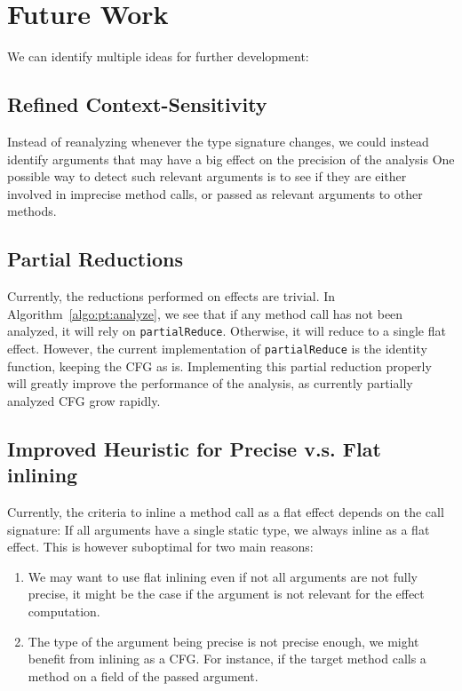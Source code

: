 \documentclass[a4paper]{article}
\begin{document}

\section{Future Work}
We can identify multiple ideas for further development:

\subsection{Refined Context-Sensitivity}
Instead of reanalyzing whenever the type signature changes, we could instead
identify arguments that may have a big effect on the precision of the analysis
One possible way to detect such relevant arguments is to see if they are either
involved in imprecise method calls, or passed as relevant arguments to other
methods.

\subsection{Partial Reductions}
Currently, the reductions performed on effects are trivial. In
Algorithm~\ref{algo:pt:analyze}, we see that if any method call has not been
analyzed, it will rely on \verb=partialReduce=. Otherwise, it will reduce to a
single flat effect. However, the current implementation of \verb=partialReduce=
is the identity function, keeping the CFG as is. Implementing this partial
reduction properly will greatly improve the performance of the analysis, as
currently partially analyzed CFG grow rapidly.

\subsection{Improved Heuristic for Precise v.s. Flat inlining}
Currently, the criteria to inline a method call as a flat effect depends on the
call signature: If all arguments have a single static type, we always inline as
a flat effect. This is however suboptimal for two main reasons:
\begin{enumerate}
    \item We may want to use flat inlining even if not all arguments are not fully
precise, it might be the case if the argument is not relevant for the effect
computation.
    \item The type of the argument being precise is not precise enough, we might
benefit from inlining as a CFG. For instance, if the target method calls a
method on a field of the passed argument.
\end{enumerate}
\end{document}
